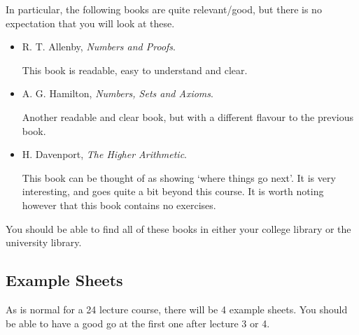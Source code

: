 \documentclass[a4]{scrartcl}
\begin{document}
In particular, the following books are quite relevant/good, but there is no expectation that you will look at these.

\begin{itemize}
	\item R. T. Allenby, \emph{Numbers and Proofs}.
	
	This book is readable, easy to understand and clear.

	\item A. G. Hamilton, \emph{Numbers, Sets and Axioms}.
	
	Another readable and clear book, but with a different flavour to the previous book.

	\item H. Davenport, \emph{The Higher Arithmetic}.

	This book can be thought of as showing `where things go next'. It is very interesting, and goes quite a bit beyond this course. It is worth noting however that this book contains no exercises.
\end{itemize}

You should be able to find all of these books in either your college library or the university library.

\subsection{Example Sheets}

As is normal for a 24 lecture course, there will be 4 example sheets. You should be able to have a good go at the first one after lecture 3 or 4.









\end{document}
